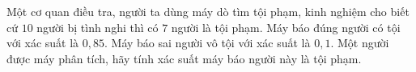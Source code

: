\begin{ex}
Một cơ quan điều tra, người ta dùng máy dò tìm tội phạm, kinh nghiệm cho biết cứ $10$ người bị tình nghi thì có $7$ người là tội phạm. Máy báo đúng người có tội với xác suất là $0{,}85$. Máy báo sai người vô tội với xác suất là $0{,}1$. Một người được máy phân tích, hãy tính xác suất máy báo người này là tội phạm.
\end{ex}

